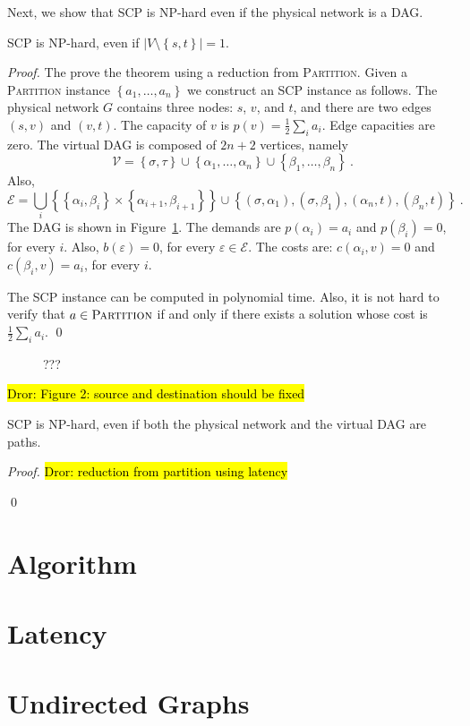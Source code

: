 \documentclass[runningheads]{llncs}
\newcommand{\set}[1]{\left\{ #1 \right\}}
\newcommand{\abs}[1]{\left| #1 \right|}
\newcommand{\half}{\frac{1}{2}}
\newcommand{\eps}{\varepsilon}
\newcommand{\scp}{\textsc{SCP}\xspace}
\newcommand{\calE}{\mathcal{E}}
\newcommand{\calV}{\mathcal{V}}
\newcommand{\dror}[1]{\sethlcolor{yellow}\hl{Dror: #1}}
\begin{document}
Next, we show that \scp is NP-hard even if the physical network is a
DAG.

\begin{theorem}
\scp is NP-hard, even if $\abs{V \setminus \set{s,t}} = 1$.
\end{theorem}
\begin{proof}
The prove the theorem using a reduction from \textsc{Partition}.
Given a \textsc{Partition} instance $\set{a_1, \ldots, a_n}$ we
construct an \scp instance as follows.
%
The physical network $G$ contains three nodes: $s$, $v$, and $t$, and
there are two edges $(s,v)$ and $(v,t)$.  The capacity of $v$ is $p(v)
= \half \sum_i a_i$.  Edge capacities are zero.
%
The virtual DAG is composed of $2n+2$ vertices, namely
\[
\calV
= \set{\sigma,\tau}
  \cup \set{\alpha_1, \ldots, \alpha_n}
  \cup \set{\beta_1, \ldots, \beta_n}
~.
\]
Also,
\[
\calE
= \bigcup_i \set{ \set{\alpha_i,\beta_i} \times \set{\alpha_{i+1},\beta_{i+1}} } 
  \cup
  \set{ (\sigma,\alpha_1), (\sigma,\beta_1), (\alpha_n,t), (\beta_n,t) }
~.
\]
The DAG is shown in Figure~\ref{fig:dag}.
%
The demands are $p(\alpha_i) = a_i$ and $p(\beta_i) = 0$, for every
$i$.  Also, $b(\eps) = 0$, for every $\eps \in \calE$.  The costs are:
$c(\alpha_i,v) = 0$ and $c(\beta_i,v) = a_i$, for every $i$.

The \scp instance can be computed in polynomial time.
%
Also, it is not hard to verify that $a \in \textsc{Partition}$ if and
only if there exists a solution whose cost is $\half \sum_i a_i$.
%
\qed
\end{proof}

\begin{figure}
\centering

\caption{???}
\label{fig:dag}
\end{figure}

\dror{Figure 2: source and destination should be fixed}

\begin{theorem}
\scp is NP-hard, even if both the physical network and the virtual DAG
are paths.
\end{theorem}
\begin{proof}

\dror{reduction from partition using latency}
  
%
\qed
\end{proof}


\section{Algorithm}




\section{Latency}


\section{Undirected Graphs}




\end{document}
